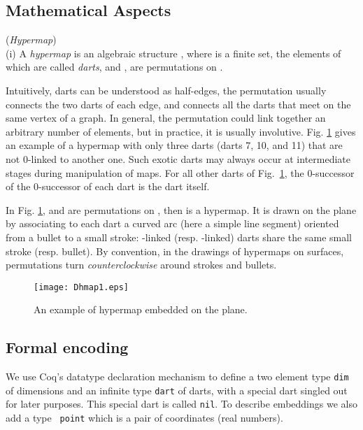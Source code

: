 \documentclass{llncs}
\begin{document}
\subsection{Mathematical Aspects}
\label{MA}

\begin{definition}({\em Hypermap})
  \label{HD}\\
  (i) A {\em hypermap} is an algebraic structure , where  is a finite set, the elements of which are
  called {\em darts}, and ,  are permutations on .\\
\end{definition}
Intuitively, darts can be understood as half-edges, the permutation
 usually connects the two darts of each edge, and
 connects all the darts that meet on the same vertex of a
graph.  In general, the  permutation could
link together an arbitrary number of elements, but in practice, it is
usually involutive.  Fig. \ref{fig:Dhmap1} gives an example of a
hypermap with
only three darts (darts 7, 10, and 11) that are not 0-linked to another one.
Such exotic darts may
always occur at intermediate stages during manipulation of maps.
For all other darts of Fig.~\ref{fig:Dhmap1},
the 0-successor of the 0-successor of each dart is the dart itself.

In Fig. \ref{fig:Dhmap1},  and  are permutations
on , then  is a
hypermap. It is drawn on the plane by associating to each dart a
curved arc (here a simple line segment) oriented from a bullet to a
small stroke: -linked (resp. -linked) darts share the same small
stroke (resp. bullet). By convention, in the drawings of hypermaps on
surfaces,  permutations turn {\em counterclockwise} around
strokes and bullets.

\begin{figure}
\begin{center}
\texttt{[image: Dhmap1.eps]}
\end{center}
\caption{An example of hypermap embedded on the plane.}
\label{fig:Dhmap1}
\end{figure}

\subsection{Formal encoding}
\label{PS}
We use Coq's datatype declaration mechanism to define a two element
type {\tt dim} of dimensions and an infinite type {\tt dart} of darts, with a
special dart singled out for later purposes. This special dart is
called {\tt nil}. To describe embeddings we also add a type {\tt
  point} which is a pair of coordinates (real numbers).
\end{document}
